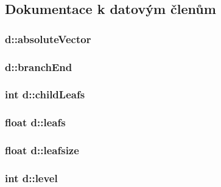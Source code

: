 \subsection{Dokumentace k datovým členům}
\hypertarget{structd_aa238833fab271a48454bcbc2eec3cf78}{
\subsubsection[{absoluteVector}]{ {\bf d::absoluteVector}}}
\label{structd_aa238833fab271a48454bcbc2eec3cf78}
\hypertarget{structd_abd8748ee11c24f45917f6bf880d1b4b7}{
\subsubsection[{branchEnd}]{ {\bf d::branchEnd}}}
\label{structd_abd8748ee11c24f45917f6bf880d1b4b7}
\hypertarget{structd_a7fe9d3c8ccfbc04c287ace5870c92186}{
\subsubsection[{childLeafs}]{\setlength{\rightskip}{0pt plus 5cm}int {\bf d::childLeafs}}}
\label{structd_a7fe9d3c8ccfbc04c287ace5870c92186}
\hypertarget{structd_a4cab83d2fbba6352d67bb6483378d144}{
\subsubsection[{leafs}]{\setlength{\rightskip}{0pt plus 5cm}float {\bf d::leafs}}}
\label{structd_a4cab83d2fbba6352d67bb6483378d144}
\hypertarget{structd_a660281b9ca49a7c6d7d7dc6faea3c8e7}{
\subsubsection[{leafsize}]{\setlength{\rightskip}{0pt plus 5cm}float {\bf d::leafsize}}}
\label{structd_a660281b9ca49a7c6d7d7dc6faea3c8e7}
\hypertarget{structd_a9889457e0e1cd5c70ffd516d1f6d7e9e}{
\subsubsection[{level}]{\setlength{\rightskip}{0pt plus 5cm}int {\bf d::level}}}
